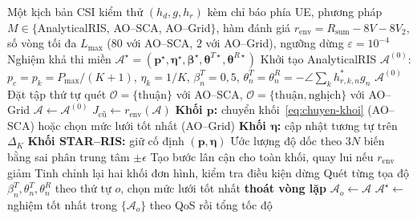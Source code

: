 \begin{algorithm}[htbp]
\caption{Quy trình giải trực tiếp trên từng kịch bản CSI của nhóm phương pháp đối chiếu}
\label{alg:doi-chieu-ao}
\begin{algorithmic}[1]
\Require Một kịch bản CSI kiểm thử $(h_d, g, h_r)$ kèm chỉ báo phía UE,
         phương pháp $M \in \{$AnalyticalRIS, AO--SCA, AO--Grid$\}$, hàm đánh giá
         $r_{\mathrm{env}} = R_{\mathrm{sum}} - 8V - 8V_2$, số vòng tối đa $L_{\max}$
         ($80$ với AO--SCA, $2$ với AO--Grid), ngưỡng dừng $\varepsilon = 10^{-4}$
\Ensure  Nghiệm khả thi miền $\mathcal{A}^\star = (\mathbf{p}^\star, \boldsymbol{\eta}^\star,
         \boldsymbol{\beta}^\star, \boldsymbol{\theta}^{T\star}, \boldsymbol{\theta}^{R\star})$
\State Khởi tạo AnalyticalRIS $\mathcal{A}^{(0)}$: $p_c = p_k = P_{\max}/(K+1)$, $\eta_k = 1/K$,
       $\beta^T_n = 0,5$, $\theta^T_n = \theta^R_n = -\angle \sum_{k} h^{*}_{r,k,n} g_n$
  \State \Return $\mathcal{A}^{(0)}$
\EndIf
\State Đặt tập thứ tự quét $\mathcal{O} = \{\text{thuận}\}$ với AO--SCA,
       $\mathcal{O} = \{\text{thuận}, \text{nghịch}\}$ với AO--Grid
  \State $\mathcal{A} \gets \mathcal{A}^{(0)}$
    \State $J_{\mathrm{cũ}} \gets r_{\mathrm{env}}(\mathcal{A})$
    \State \textbf{Khối $\mathbf{p}$:} chuyển khối~\eqref{eq:chuyen-khoi} (AO--SCA) hoặc
           chọn mức lưới tốt nhất (AO--Grid)
    \State \textbf{Khối $\boldsymbol{\eta}$:} cập nhật tương tự trên $\Delta_K$
    \State \textbf{Khối STAR--RIS:} giữ cố định $(\mathbf{p}, \boldsymbol{\eta})$
      \State Ước lượng độ dốc theo $3N$ biến bằng sai phân trung tâm $\pm\epsilon$
      \State Tạo bước lân cận cho toàn khối, quay lui nếu $r_{\mathrm{env}}$ giảm
      \State Tinh chỉnh lại hai khối đơn hình, kiểm tra điều kiện dừng
    \Else
      \State Quét từng tọa độ $\beta^T_n, \theta^T_n, \theta^R_n$ theo thứ tự $o$, chọn mức lưới tốt nhất
    \EndIf
      \State \textbf{thoát vòng lặp}
    \EndIf
  \EndFor
  \State $\mathcal{A}_o \gets \mathcal{A}$
\EndFor
\State \Return $\mathcal{A}^\star \gets$ nghiệm tốt nhất trong $\{\mathcal{A}_o\}$ theo QoS rồi tổng tốc độ
\end{algorithmic}
\end{algorithm}
